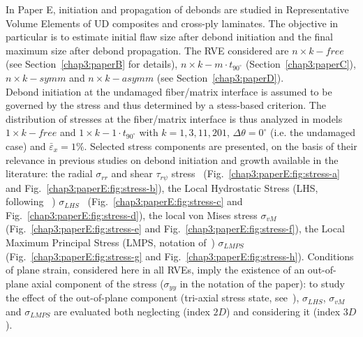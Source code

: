 In Paper E, initiation and propagation of debonds are studied in Representative Volume Elements of UD composites and cross-ply laminates. The objective in particular is to estimate initial flaw size after debond initiation and the final maximum size after debond propagation. The RVE considered are $n\times k-free$ (see Section~\ref{chap3:paperB} for details), $n\times k-m\cdot t_{90^{\circ}}$ (Section~\ref{chap3:paperC}), $n\times k-symm$ and $n\times k-asymm$ (see Section~\ref{chap3:paperD}).\\
Debond initiation at the undamaged fiber/matrix interface is assumed to be governed by the stress and thus determined by a stess-based criterion. The distribution of stresses at the fiber/matrix interface is thus analyzed in models $1\times k-free$ and $1\times k-1\cdot t_{90^{\circ}}$ with $k=1,3,11,201$, $\Delta\theta=0^{\circ}$ (i.e. the undamaged case) and $\bar{\varepsilon}_{x}=1\%$. Selected stress components are presented, on the basis of their relevance in previous studies on debond initiation and growth available in the literature: the radial $\sigma_{rr}$ and shear $\tau_{r\psi}$ stress~\cite{Mantic2009} (Fig.~\ref{chap3:paperE:fig:stress-a} and Fig.~\ref{chap3:paperE:fig:stress-b}), the Local Hydrostatic Stress (LHS, following ~\cite{Carraro2016}) $\sigma_{LHS}$~\cite{Asp1996a,Asp1996b} (Fig.~\ref{chap3:paperE:fig:stress-c} and Fig.~\ref{chap3:paperE:fig:stress-d}), the local von Mises stress $\sigma_{vM}$~\cite{Canal2012}  (Fig.~\ref{chap3:paperE:fig:stress-e} and Fig.~\ref{chap3:paperE:fig:stress-f}), the Local Maximum Principal Stress (LMPS, notation of~\cite{Carraro2016}) $\sigma_{LMPS}$~\cite{Carraro2014}  (Fig.~\ref{chap3:paperE:fig:stress-g} and Fig.~\ref{chap3:paperE:fig:stress-h}). Conditions of plane strain, considered here in all RVEs, imply the existence of an out-of-plane axial component of the stress ($\sigma_{yy}$ in the notation of the paper): to study the effect of the out-of-plane component (tri-axial stress state, see~\cite{Asp1995}), $\sigma_{LHS}$, $\sigma_{vM}$ and $\sigma_{LMPS}$ are evaluated both neglecting (index $2D$) and considering it (index $3D$).

